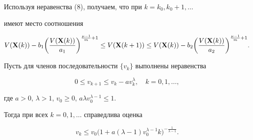 Используя неравенства (8), получаем, что при $k=k_0, k_0+1,\dotsc$


имеют место соотношения


\begin{equation}


V (\bold X(k))-b_1 \bigg(\frac{V (\bold X(k))}{a_1}\bigg)^{\frac{\mu-1}m+1}


\leq V(\bold X(k+1))\leq 


V (\bold X(k))-b_2


\bigg(\frac{V (\bold X(k))}{a_2}\bigg)^{\frac{\mu-1}m+1}.


\end{equation}








\begin{lem}


Пусть для членов последовательности $\{v_k\}$ выполнены неравенства


\begin{equation}


0\leq v_{k+1}\leq v_k-av^\lambda_k, \quad k=0,1,\dotsc,


\end{equation}


где $a>0$, $\lambda>1$, $v_0\geq 0$, $a \lambda v^{\lambda-1}_0\leq 1$.


Тогда при всех $k=0,1,\dotsc$ справедлива оценка


\begin{equation}


v_k\leq v_0 \big(1+ a (\lambda-1) v^{\lambda-1}_0 k


\big)^{-\frac1{\lambda-1}}.


\end{equation}


\end{lem}





